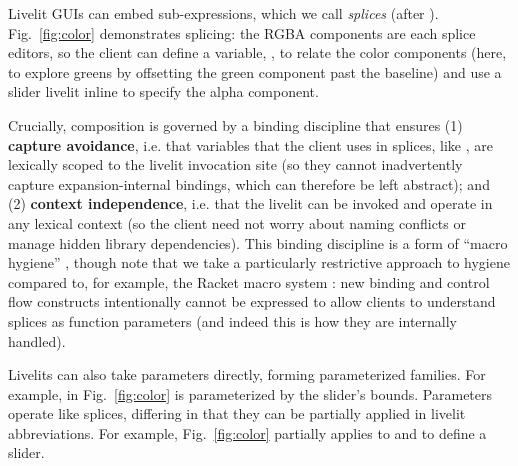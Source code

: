 %
   Livelit GUIs can embed sub-expressions, which we call \emph{splices} (after
   \citet{TLMs}).
  Fig.~\ref{fig:color} demonstrates splicing: the RGBA components
  are each splice editors, so the client can define a variable, ,
  to relate the color components (here, to explore greens by offsetting the green component past the baseline)
  and use a slider livelit inline to specify the alpha component.

  Crucially, composition is
  governed by a binding discipline that ensures
  (1) \textbf{capture avoidance}, i.e. that variables that the client uses in splices, like ,
  are lexically scoped to the livelit invocation site (so they cannot inadvertently capture expansion-internal bindings, which can therefore be left abstract); and
  (2) \textbf{context independence}, i.e. that the livelit
  can be invoked and operate in any lexical context (so the client need not worry about naming conflicts or manage hidden library dependencies).
  This binding discipline is a form of ``macro hygiene'' \cite{TLMs, adamsHygiene, DBLP:conf/popl/ClingerR91},
  though note that we take a particularly restrictive approach to hygiene compared to, for example, the Racket macro system \cite{DBLP:conf/popl/Flatt16}:
  new binding and control flow constructs intentionally cannot be expressed to allow clients to understand splices as
  function parameters (and indeed this is how they are internally handled).


 Livelits can also take parameters directly, forming parameterized families.
  For example,  in Fig.~\ref{fig:color} is parameterized by the slider's bounds.
  Parameters operate like splices, differing in that they can be partially applied in
  livelit abbreviations. For example, Fig.~\ref{fig:color}
  partially applies  to  and  to define a  slider.

